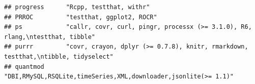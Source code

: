 \documentclass[]{article}
\begin{document}
\begin{verbatim}
## progress      "Rcpp, testthat, withr"                                                                                                                                                                                                                                                                                                                                                                                                                                                                                                                                                                   
## PRROC         "testthat, ggplot2, ROCR"                                                                                                                                                                                                                                                                                                                                                                                                                                                                                                                                                                 
## ps            "callr, covr, curl, pingr, processx (>= 3.1.0), R6, rlang,\ntestthat, tibble"                                                                                                                                                                                                                                                                                                                                                                                                                                                                                                             
## purrr         "covr, crayon, dplyr (>= 0.7.8), knitr, rmarkdown, testthat,\ntibble, tidyselect"                                                                                                                                                                                                                                                                                                                                                                                                                                                                                                         
## quantmod      "DBI,RMySQL,RSQLite,timeSeries,XML,downloader,jsonlite(>= 1.1)"                                                                                                                                                                                                                                                                                                                                                                                                                                                                                                                           

\end{verbatim}
\end{document}
